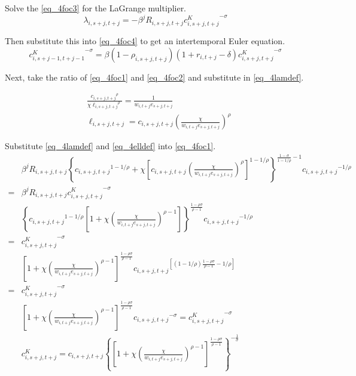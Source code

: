 \documentclass[letterpaper,12pt]{article}
\theoremstyle{definition}
\numberwithin{equation}{section}
\begin{document}
\begin{spacing}{1.5}
	Solve the \eqref{eq_4foc3} for the LaGrange multiplier.
	\begin{equation}\label{eq_4lamdef}
	       \lambda_{i,s+j,t+j} = -\beta^j R_{i,s+j,t+j} {c^K_{i,s+j,t+j}}^{-\sigma}
	\end{equation}

	Then substitute this into \eqref{eq_4foc4} to get an intertemporal Euler equation.
	\begin{equation}
	       {c^K_{i,s+j-1,t+j-1}}^{-\sigma} = \beta (1-\rho_{i,s+j,t+j}) (1+r_{i,t+j}-\delta) {c^K_{i,s+j,t+j}}^{-\sigma}
	\end{equation}

	Next, take the ratio of \eqref{eq_4foc1} and \eqref{eq_4foc2} and substitute in \eqref{eq_4lamdef}.

	\begin{align}
		& \frac{{c_{i,s+j,t+j}}^{\rho}} {\chi {\ell_{i,s+j,t+j}}^{\rho}} = \frac{1}{w_{i,t+j} e_{s+j,t+j}} \nonumber \\
		& \ell_{i,s+j,t+j} = c_{i,s+j,t+j} \left(\frac{\chi}{w_{i,t+j} e_{s+j,t+j}}\right)^\rho \label{eq_4elldef}
 	\end{align}

	Substitute \eqref{eq_4lamdef} and \eqref{eq_4elldef} into \eqref{eq_4foc1}.
	\begin{align}
		& \beta^j R_{i,s+j,t+j}\left\{ {c_{i,s+j,t+j}}^{1-1/\rho} + \chi \left[c_{i,s+j,t+j} \left(\frac{\chi}{w_{i,t+j} e_{s+j,t+j}}\right)^\rho\right]^{1-1/\rho}\right\}^{\tfrac{{1-\sigma}}{1-1/\rho}-1}  {c_{i,s+j,t+j}}^{-1/\rho}  \nonumber \\ = &  \beta^j R_{i,s+j,t+j} {c^K_{i,s+j,t+j}}^{-\sigma} \nonumber \\
		& \left\{ {c_{i,s+j,t+j}}^{1-1/\rho} \left[1 + \chi \left(\frac{\chi}{w_{i,t+j} e_{s+j,t+j}}\right)^{\rho-1}\right]\right\}^{\tfrac{1-\rho \sigma}{\rho-1}}  {c_{i,s+j,t+j}}^{-1/\rho}  \nonumber \\ = &   {c^K_{i,s+j,t+j}}^{-\sigma} \nonumber \\
		& \left[1 + \chi \left(\frac{\chi}{w_{i,t+j} e_{s+j,t+j}}\right)^{\rho-1}\right]^{\tfrac{1-\rho \sigma}{\rho-1}}  {c_{i,s+j,t+j}}^{\left[(1-1/\rho) \tfrac{1-\rho\sigma}{\rho-1}-1/\rho\right]}  \nonumber \\ = & {c^K_{i,s+j,t+j}}^{-\sigma} \nonumber \\
		& \left[1 + \chi \left(\frac{\chi}{w_{i,t+j} e_{s+j,t+j}}\right)^{\rho-1}\right]^{\tfrac{1-\rho \sigma}{\rho-1}}  {c_{i,s+j,t+j}}^{-\sigma} =  {c^K_{i,s+j,t+j}}^{-\sigma} \nonumber \\
		& c^K_{i,s+j,t+j} = c_{i,s+j,t+j} \left\{ \left[1 + \chi \left(\frac{\chi}{w_{i,t+j} e_{s+j,t+j}}\right)^{\rho-1}\right]^{\tfrac{1-\rho \sigma}{\rho-1}} \right\}^{-\tfrac{1}{\sigma}} \nonumber
	\end{align}


\end{spacing}
\end{document}
